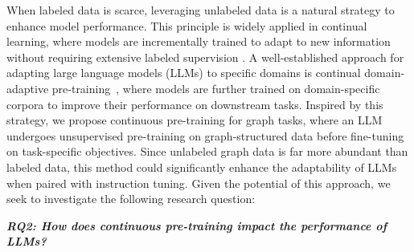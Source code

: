 
When labeled data is scarce, leveraging unlabeled data is a natural strategy to enhance model performance. This principle is widely applied in continual learning, where models are incrementally trained to adapt to new information without requiring extensive labeled supervision \cite{wang2024comprehensive, van2019three}. A well-established approach for adapting large language models (LLMs) to specific domains is continual domain-adaptive pre-training~\cite{ke2023continual,yildiz2024investigating}, where models are further trained on domain-specific corpora to improve their performance on downstream tasks. Inspired by this strategy, we propose continuous pre-training for graph tasks, where an LLM undergoes unsupervised pre-training on graph-structured data before fine-tuning on task-specific objectives. Since unlabeled graph data is far more abundant than labeled data, this method could significantly enhance the adaptability of LLMs when paired with instruction tuning. Given the potential of this approach, we seek to investigate the following research question:


\vspace{0.5\baselineskip}
\begin{mdframed}[backgroundcolor=gray!8]
\textbf{\textit{RQ2: How does continuous pre-training impact the performance of LLMs?}}
\end{mdframed}
\vspace{0.5\baselineskip}


